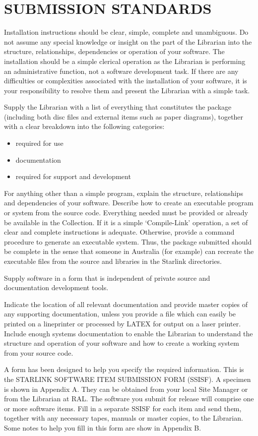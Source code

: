 \section {SUBMISSION STANDARDS}
Installation instructions should be clear, simple, complete and unambiguous.
Do not assume any special knowledge or insight on the part of the Librarian
into the structure, relationships, dependencies or operation of your software.
The installation should be a simple clerical operation as the Librarian is
performing an administrative function, not a software development task.
If there are any difficulties or complexities associated with the installation
of your software, it is your responsibility to resolve them and present the
Librarian with a simple task.

Supply the Librarian with a list of everything that constitutes the package
(including both disc files and external items such as paper diagrams), together
with a clear breakdown into the following categories:
\begin{itemize}
\item required for use
\item documentation
\item required for support and development
\end{itemize}
For anything other than a simple program, explain the structure, relationships
and dependencies of your software.
Describe how to create an executable program or system from the source code.
Everything needed must be provided or already be available in the Collection.
If it is a simple `Compile-Link' operation, a set of clear and complete
instructions is adequate.
Otherwise, provide a command procedure to generate an executable system.
Thus, the package submitted should be complete in the sense that someone in
Australia (for example) can recreate the executable files from the source and
libraries in the Starlink directories.

Supply software in a form that is independent of private source and
documentation development tools.

Indicate the location of all relevant documentation and provide master copies of
any supporting documentation, unless you provide a file which can easily be
printed on a lineprinter or processed by LATEX for output on a laser printer.
Include enough systems documentation to enable the Librarian to understand the
structure and operation of your software and how to create a working system
from your source code.

A form has been designed to help you specify the required information.
This is the STARLINK SOFTWARE ITEM SUBMISSION FORM (SSISF).
A specimen is shown in Appendix A.
They can be obtained from your local Site Manager or from the Librarian at RAL.
The software you submit for release will comprise one or more software items.
Fill in a separate SSISF for each item and send them, together with any
necessary tapes, manuals or master copies, to the Librarian.
Some notes to help you fill in this form are show in Appendix B.

